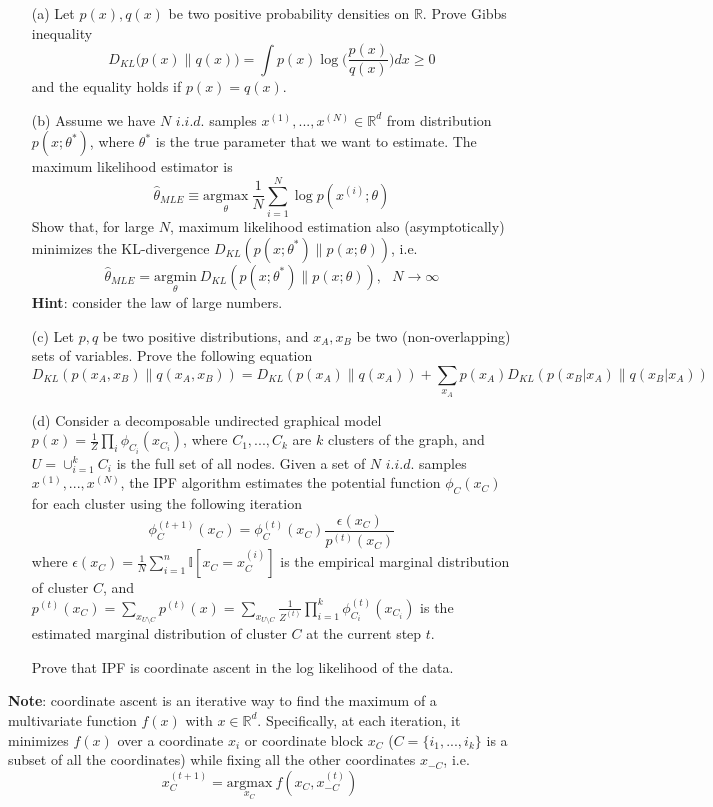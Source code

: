 \begin{itemize}
\item[(a)] Let $p(x), q(x)$ be two positive probability densities on $\mathbb{R}$. Prove Gibbs inequality $$D_{KL}\big(p(x) \| q(x)\big) = \int p(x)\log\Big( \frac{p(x)}{q(x)}\Big) dx \geq 0$$ and the equality holds if $p(x) = q(x)$.
\item[(b)] Assume we have $N$ $i.i.d.$ samples $x^{(1)}, ..., x^{(N)} \in \mathbb{R}^d$ from distribution $p(x; \theta^*)$, where $\theta^*$ is the true parameter that we want to estimate. The maximum likelihood estimator is $$\widehat{\theta}_{MLE} \equiv \underset{\theta}{\text{argmax}} ~ \frac{1}{N}\sum_{i=1}^N \log p(x^{(i)}; \theta)$$
Show that, for large $N$, maximum likelihood estimation also (asymptotically) minimizes the KL-divergence $D_{KL}(p(x; \theta^*) \| p(x; \theta))$, i.e. 
$$\widehat{\theta}_{MLE} = \underset{\theta}{\text{argmin}} ~ D_{KL}(p(x; \theta^*) \| p(x; \theta)), ~~~ N \rightarrow \infty$$
\textbf{Hint}: consider the law of large numbers.
\item[(c)] Let $p, q$ be two positive distributions, and $x_A, x_B$ be two (non-overlapping) sets of variables. Prove the following equation $$D_{KL}(p(x_A, x_B) \| q(x_A, x_B)) = D_{KL}(p(x_A) \| q(x_A)) + \sum_{x_{A}}p(x_A)D_{KL}(p(x_B | x_A) \| q(x_B | x_A))$$
\item[(d)] Consider a decomposable undirected graphical model $p(x) = \frac{1}{Z} \prod_i \phi_{C_i}(x_{C_i})$, where $C_1,...,C_k$ are $k$ clusters of the graph, and $U = \cup_{i=1}^k C_i$ is the full set of all nodes. Given a set of $N$ $i.i.d.$ samples $x^{(1)},..., x^{(N)}$, the IPF algorithm estimates the potential function $\phi_C(x_C)$ for each cluster using the following iteration $$\phi_C^{(t+1)}(x_C) = \phi_C^{(t)}(x_C)\frac{\epsilon(x_C)}{p^{(t)}(x_C)}$$
where $\epsilon(x_C) = \frac{1}{N}\sum_{i=1}^{n}\mathbb{I}[x_C = x_C^{(i)}]$ is the empirical marginal distribution of cluster $C$, and $p^{(t)}(x_C) = \sum_{x_{U \setminus C}} p^{(t)}(x) = \sum_{x_{U \setminus C}} \frac{1}{Z^{(t)}} \prod_{i=1}^k \phi_{C_i}^{(t)}(x_{C_i})$ is the estimated marginal distribution of cluster $C$ at the current step $t$. 

Prove that IPF is coordinate ascent in the log likelihood of the data.

\end{itemize}
\textbf{Note}: coordinate ascent is an iterative way to find the maximum of a multivariate function $f(x)$ with $x \in \mathbb{R}^d$. Specifically, at each iteration, it minimizes $f(x)$ over a coordinate $x_i$ or coordinate block $x_C$ ($C = \{i_1,...,i_k\}$ is a subset of all the coordinates) while fixing all the other coordinates $x_{-C}$, i.e. 
$$x_C^{(t+1)} = \underset{x_C}{\text{argmax}} ~f(x_C, x_{-C}^{(t)}) $$


